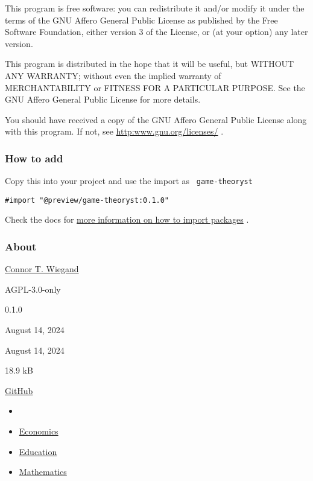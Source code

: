 This program is free software: you can redistribute it and/or modify it
under the terms of the GNU Affero General Public License as published by
the Free Software Foundation, either version 3 of the License, or (at
your option) any later version.

This program is distributed in the hope that it will be useful, but
WITHOUT ANY WARRANTY; without even the implied warranty of
MERCHANTABILITY or FITNESS FOR A PARTICULAR PURPOSE. See the GNU Affero
General Public License for more details.

You should have received a copy of the GNU Affero General Public License
along with this program. If not, see
\href{http://www.gnu.org/licenses/}{http:www.gnu.org/licenses/} .

\subsubsection{How to add}\label{how-to-add}

Copy this into your project and use the import as
\texttt{\ game-theoryst\ }

\begin{verbatim}
#import "@preview/game-theoryst:0.1.0"
\end{verbatim}



Check the docs for
\href{https://typst.app/docs/reference/scripting/\#packages}{more
information on how to import packages} .

\subsubsection{About}\label{about}

\begin{description}
\tightlist
\item[Author :]
\href{https://github.com/connortwiegand}{Connor T. Wiegand}
\item[License:]
AGPL-3.0-only
\item[Current version:]
0.1.0
\item[Last updated:]
August 14, 2024
\item[First released:]
August 14, 2024
\item[Archive size:]
18.9 kB
\href{https://packages.typst.org/preview/game-theoryst-0.1.0.tar.gz}{\pandocbounded{}}
\item[Repository:]
\href{https://github.com/connortwiegand/game-theoryst}{GitHub}
\item[Discipline s :]
\begin{itemize}
\tightlist
\item[]
\item
  \href{https://typst.app/universe/search/?discipline=economics}{Economics}
\item
  \href{https://typst.app/universe/search/?discipline=education}{Education}
\item
  \href{https://typst.app/universe/search/?discipline=mathematics}{Mathematics}
\end{itemize}
\end{description}

